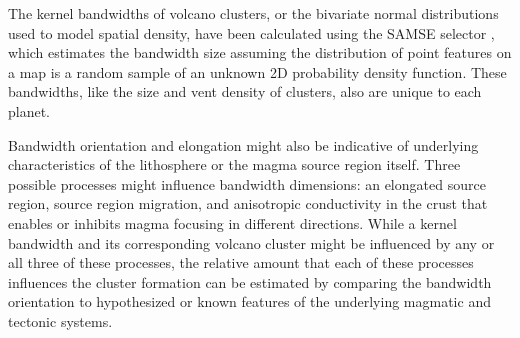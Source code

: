The kernel bandwidths of volcano clusters, or the bivariate normal distributions used to model spatial density, have been calculated using the SAMSE selector \citep{duong2007}, which estimates the bandwidth size assuming the distribution of point features on a map is a random sample of an unknown 2D probability density function. These bandwidths, like the size and vent density of clusters, also are unique to each planet. 

Bandwidth orientation and elongation might also be indicative of underlying characteristics of the lithosphere or the magma source region itself. Three possible processes might influence bandwidth dimensions: an elongated source region, source region migration, and anisotropic conductivity in the crust that enables or inhibits magma focusing in different directions. While a kernel bandwidth and its corresponding volcano cluster might be influenced by any or all three of these processes, the relative amount that each of these processes influences the cluster formation can be estimated by comparing the bandwidth orientation to hypothesized or known features of the underlying magmatic and tectonic systems.


% 

